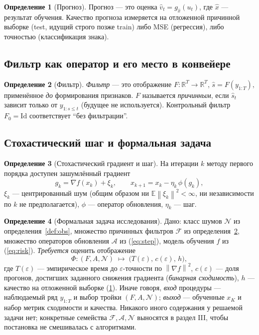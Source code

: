 \documentclass[conference]{IEEEtran}
\theoremstyle{plain}
\theoremstyle{definition}
\newtheorem{definition}{Определение}
\newcommand{\R}{\mathbb{R}}
\newcommand{\E}{\mathbb{E}}
\newcommand{\norm}[1]{\left\lVert#1\right\rVert}
\begin{document}
\begin{definition}[Прогноз]\label{def:forecast}
Прогноз --- это оценка $\hat v_{t}=g_{\hat x}(u_t)$, где $\hat x$ ---
результат обучения. Качество прогноза измеряется на отложенной
причинной выборке (test, идущий строго позже train) либо MSE
(регрессия), либо точностью (классификация знака).
\end{definition}

\subsection{Фильтр как оператор и его место в конвейере}
\begin{definition}[Фильтр]\label{def:filter}
\emph{Фильтр} --- это отображение
$F\colon \R^T\to\R^T$, $\hat s = F(y_{1:T})$,
применённое \emph{до} формирования признаков. $F$ называется
\emph{причинным}, если $\hat s_t$ зависит только от $y_{1:s\le t}$
(будущее не используется). Контрольный фильтр $F_0=\mathrm{Id}$
соответствует ``без фильтрации''.
\end{definition}

\subsection{Стохастический шаг и формальная задача}
\begin{definition}[Стохастический градиент и шаг]
На итерации $k$ методу первого порядка доступен зашумлённый градиент
\begin{equation}
g_k = \nabla f(x_k) + \xi_k,\qquad
x_{k+1} = x_k - \eta_k\,\phi(g_k),
\label{eq:step}
\end{equation}
$\xi_k$ --- центрированный шум (общим образом ни
$\E\norm{\xi_k}^2<\infty$, ни независимости по $k$ не предполагается),
$\phi$ --- оператор обновления, $\eta_k$ --- шаг.
\end{definition}

\begin{definition}[Формальная задача исследования]\label{def:research}
Дано: класс шумов $\mathcal N$ из определения~\ref{def:obs}, множество
причинных фильтров $\mathcal F$ из определения~\ref{def:filter}, множество
операторов обновления $\mathcal A$ из (\ref{eq:step}), модель обучения
$f$ из (\ref{eq:risk}). \emph{Требуется} оценить отображение
\begin{equation}
\Phi\colon (F,A,\mathcal N) \;\mapsto\; \big(T(\varepsilon),\,c(\varepsilon),\,h\big),
\label{eq:research}
\end{equation}
где $T(\varepsilon)$ --- эмпирическое время до $\varepsilon$-точности
по $\norm{\nabla f}^2$, $c(\varepsilon)$ --- доля прогонов, достигших
заданного снижения градиента (\emph{бинарная сходимость}), $h$ ---
качество на отложенной выборке (\ref{def:forecast}). Иначе говоря,
\emph{вход} процедуры --- наблюдаемый ряд $y_{1:T}$ и выбор тройки
$(F,A,\mathcal N)$; \emph{выход} --- обученные $x_K$ и набор метрик
сходимости и качества. Никакого иного содержания у решаемой задачи
нет; конкретные семейства $\mathcal F,\mathcal A,\mathcal N$ выносятся
в раздел III, чтобы постановка не смешивалась с алгоритмами.
\end{definition}
\end{document}
